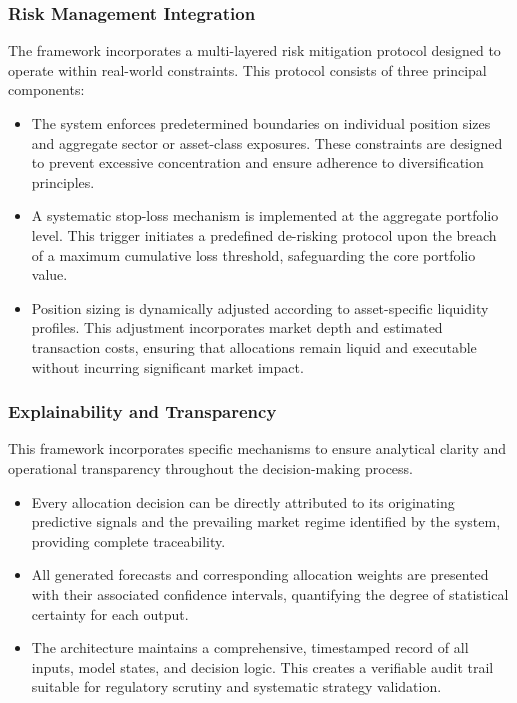 \documentclass{singlecol-new}
\theoremstyle{TH}{
\newtheorem{lemma}{Lemma}
\newtheorem{theorem}[lemma]{Theorem}
\newtheorem{corrolary}[lemma]{Corrolary}
\newtheorem{conjecture}[lemma]{Conjecture}
\newtheorem{proposition}[lemma]{Proposition}
\newtheorem{claim}[lemma]{Claim}
\newtheorem{stheorem}[lemma]{Wrong Theorem}
\newtheorem{algorithm}{Algorithm}
}
\theoremstyle{THrm}{
\newtheorem{definition}{Definition}[section]
\newtheorem{question}{Question}[section]
\newtheorem{remark}{Remark}
\newtheorem{scheme}{Scheme}
}
\theoremstyle{THhit}{
\newtheorem{case}{Case}[section]
}
\begin{document}
\subsubsection{Risk Management Integration}
The framework incorporates a multi-layered risk mitigation protocol designed to operate within real-world constraints. This protocol consists of three principal components:
\begin{itemize}
    \item The system enforces predetermined boundaries on individual position sizes and aggregate sector or asset-class exposures. These constraints are designed to prevent excessive concentration and ensure adherence to diversification principles.
    \item A systematic stop-loss mechanism is implemented at the aggregate portfolio level. This trigger initiates a predefined de-risking protocol upon the breach of a maximum cumulative loss threshold, safeguarding the core portfolio value.
    \item Position sizing is dynamically adjusted according to asset-specific liquidity profiles. This adjustment incorporates market depth and estimated transaction costs, ensuring that allocations remain liquid and executable without incurring significant market impact.
\end{itemize}

\subsubsection{Explainability and Transparency}
This framework incorporates specific mechanisms to ensure analytical clarity and operational transparency throughout the decision-making process.
\begin{itemize}
    \item Every allocation decision can be directly attributed to its originating predictive signals and the prevailing market regime identified by the system, providing complete traceability.
    \item All generated forecasts and corresponding allocation weights are presented with their associated confidence intervals, quantifying the degree of statistical certainty for each output.
    \item The architecture maintains a comprehensive, timestamped record of all inputs, model states, and decision logic. This creates a verifiable audit trail suitable for regulatory scrutiny and systematic strategy validation.
\end{itemize}
\end{document}
